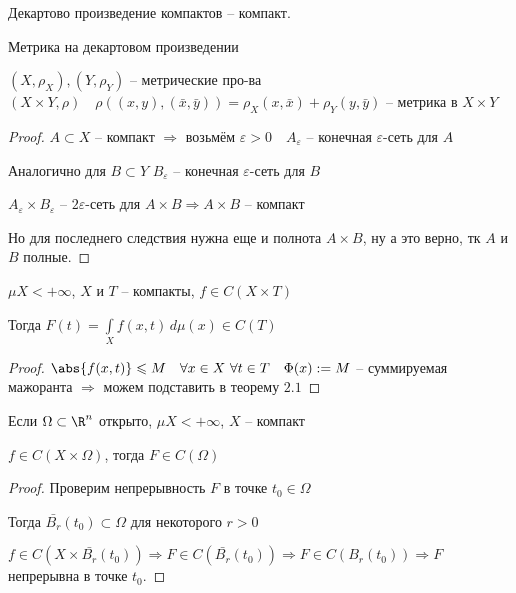 

\begin{lemma}
	
	Декартово произведение компактов -- компакт. 
	
\end{lemma}

\begin{remark}
	
	Метрика на декартовом произведении 
	
	$(X, \rho_X), (Y, \rho_Y)$ -- метрические про-ва $(X\times Y, \rho) \quad \rho((x, y), (\bar{x}, \bar{y})) = \rho_X(x, \bar{x}) + \rho_Y(y, \bar{y})$ -- метрика в $X\times Y$	
	
\end{remark}

\begin{proof}\thmslashn
	
	
	$A\subset X$ -- компакт $\Rightarrow$ возьмём $\varepsilon > 0 \quad A_\varepsilon$ -- конечная $\varepsilon$-сеть для $A$
	
	Аналогично для $B\subset Y$ $B_\varepsilon$ -- конечная $\varepsilon$-сеть для $B$
	
	$A_\varepsilon \times B_\varepsilon$ -- $2\varepsilon$-сеть для $A\times B \Rightarrow A\times B$ -- компакт
	
	Но для последнего следствия нужна еще и полнота $A\times B$, ну а это верно, тк $A$ и $B$ полные.
	
\end{proof}

\begin{theorem}\thmslashn
	
	$\mu X < +\infty$, $X$ и $T$ -- компакты, $f \in C(X\times T)$
	
	Тогда $F(t) = \int\limits_{X} f(x, t) \,d\mu (x) \in C(T)$
	
\end{theorem}

\begin{proof}\thmslashn
	
	$\abs{f(x, t)}\leqslant M \quad \forall x \in X \,\,\forall t \in T \quad \Phi(x):= M$ -- суммируемая мажоранта $\Rightarrow$ можем подставить в теорему $2.1$
	
\end{proof}

\begin{consequence}\thmslashn
	
	Если $\Omega \subset \R^n$ открыто, $\mu X < +\infty$, $X$ -- компакт
	
	$f\in C(X\times\Omega)$, тогда $F \in C(\Omega)$
	
\end{consequence}

\begin{proof}\thmslashn
	
	Проверим непрерывность $F$ в точке $t_0 \in \Omega$
	
	Тогда $\bar{B_r}(t_0) \subset \Omega$ для некоторого $r > 0$
	
	$f\in C(X \times \bar{B_r}(t_0)) \Rightarrow F \in C(\bar{B_r}(t_0)) \Rightarrow F\in C(B_r(t_0)) \Rightarrow F$ непрерывна в точке $t_0$.
	
\end{proof}